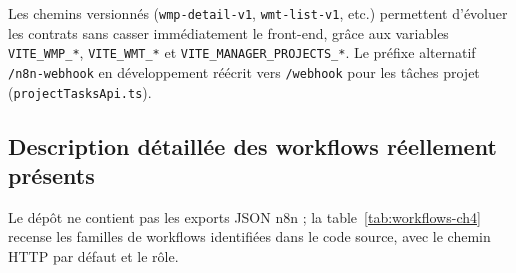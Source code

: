 Les chemins versionnés (\texttt{wmp-detail-v1}, \texttt{wmt-list-v1}, etc.) permettent d'évoluer les contrats sans casser immédiatement le front-end, grâce aux variables \texttt{VITE\_WMP\_*}, \texttt{VITE\_WMT\_*} et \texttt{VITE\_MANAGER\_PROJECTS\_*}. Le préfixe alternatif \texttt{/n8n-webhook} en développement réécrit vers \texttt{/webhook} pour les tâches projet (\texttt{projectTasksApi.ts}).

\subsection{Description détaillée des workflows réellement présents}

Le dépôt ne contient pas les exports JSON n8n ; la table~\ref{tab:workflows-ch4} recense les familles de workflows identifiées dans le code source, avec le chemin HTTP par défaut et le rôle.

